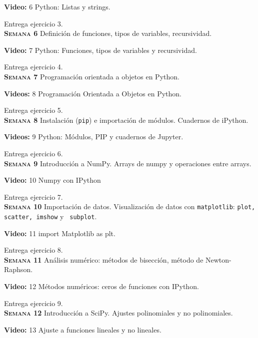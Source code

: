 \documentclass[letterpaper,10pt,onecolumn]{article}
\begin{document}
\textbf{Video:} 6  Python: Listas y strings.

Entrega ejercicio 3.
\\[-0.3cm] 

\noindent\textbf{\textsc{Semana 6}} Definición de funciones,
tipos de variables, recursividad. 

\textbf{Video:} 7 Python: Funciones, tipos de variables y recursividad.

Entrega ejercicio 4.
\\[-0.3cm] 

\noindent\textbf{\textsc{Semana 7}} Programaci\'on orientada a objetos en Python. 

\textbf{Videos:} 8 Programación Orientada a Objetos en Python.

Entrega ejercicio 5.
\\[-0.3cm]  

\noindent\textbf{\textsc{Semana 8}} Instalación (\verb+pip+) e importación de módulos. Cuadernos de iPython.

\textbf{Videos:} 9 Python: Módulos, PIP y cuadernos de Jupyter.

Entrega ejercicio 6.
\\[-0.3cm]  


\noindent\textbf{\textsc{Semana 9}} Introducción a NumPy. Arrays de numpy y operaciones entre arrays. 

\textbf{Video:} 10 Numpy con IPython

Entrega ejercicio 7.
\\[-0.3cm]  


\noindent\textbf{\textsc{Semana 10}}  Importación de datos. Visualización de datos con
\verb+matplotlib+: \verb+plot, scatter, imshow+ y  \verb+ subplot+.

\textbf{Video:} 11 import Matplotlib as plt.

Entrega ejercicio 8.
\\[-0.3cm]  

\noindent\textbf{\textsc{Semana 11}} Análisis numérico: métodos de bisección, método de Newton-Raphson. 

\textbf{Video:} 12 Métodos numéricos: ceros de funciones con IPython.

Entrega ejercicio 9.
\\[-0.3cm]  


\noindent\textbf{\textsc{Semana 12}} Introducción a
SciPy. Ajustes polinomiales y no polinomiales.

\textbf{Video:} 13 Ajuste a funciones lineales y no lineales.
\end{document}
